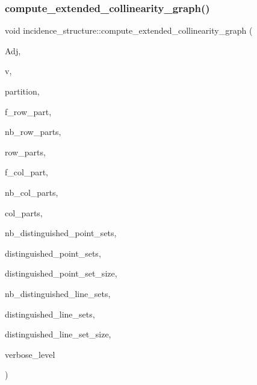 \subsubsection{\texorpdfstring{compute\+\_\+extended\+\_\+collinearity\+\_\+graph()}{compute\_extended\_collinearity\_graph()}}
{\footnotesize\ttfamily void incidence\+\_\+structure\+::compute\+\_\+extended\+\_\+collinearity\+\_\+graph (\begin{DoxyParamCaption}\item[{\mbox{\hyperlink{galois_8h_a09fddde158a3a20bd2dcadb609de11dc}{I\+NT}} $\ast$\&}]{Adj,  }\item[{\mbox{\hyperlink{galois_8h_a09fddde158a3a20bd2dcadb609de11dc}{I\+NT}} \&}]{v,  }\item[{\mbox{\hyperlink{galois_8h_a09fddde158a3a20bd2dcadb609de11dc}{I\+NT}} $\ast$\&}]{partition,  }\item[{\mbox{\hyperlink{galois_8h_a09fddde158a3a20bd2dcadb609de11dc}{I\+NT}}}]{f\+\_\+row\+\_\+part,  }\item[{\mbox{\hyperlink{galois_8h_a09fddde158a3a20bd2dcadb609de11dc}{I\+NT}}}]{nb\+\_\+row\+\_\+parts,  }\item[{\mbox{\hyperlink{galois_8h_a09fddde158a3a20bd2dcadb609de11dc}{I\+NT}} $\ast$}]{row\+\_\+parts,  }\item[{\mbox{\hyperlink{galois_8h_a09fddde158a3a20bd2dcadb609de11dc}{I\+NT}}}]{f\+\_\+col\+\_\+part,  }\item[{\mbox{\hyperlink{galois_8h_a09fddde158a3a20bd2dcadb609de11dc}{I\+NT}}}]{nb\+\_\+col\+\_\+parts,  }\item[{\mbox{\hyperlink{galois_8h_a09fddde158a3a20bd2dcadb609de11dc}{I\+NT}} $\ast$}]{col\+\_\+parts,  }\item[{\mbox{\hyperlink{galois_8h_a09fddde158a3a20bd2dcadb609de11dc}{I\+NT}}}]{nb\+\_\+distinguished\+\_\+point\+\_\+sets,  }\item[{\mbox{\hyperlink{galois_8h_a09fddde158a3a20bd2dcadb609de11dc}{I\+NT}} $\ast$$\ast$}]{distinguished\+\_\+point\+\_\+sets,  }\item[{\mbox{\hyperlink{galois_8h_a09fddde158a3a20bd2dcadb609de11dc}{I\+NT}} $\ast$}]{distinguished\+\_\+point\+\_\+set\+\_\+size,  }\item[{\mbox{\hyperlink{galois_8h_a09fddde158a3a20bd2dcadb609de11dc}{I\+NT}}}]{nb\+\_\+distinguished\+\_\+line\+\_\+sets,  }\item[{\mbox{\hyperlink{galois_8h_a09fddde158a3a20bd2dcadb609de11dc}{I\+NT}} $\ast$$\ast$}]{distinguished\+\_\+line\+\_\+sets,  }\item[{\mbox{\hyperlink{galois_8h_a09fddde158a3a20bd2dcadb609de11dc}{I\+NT}} $\ast$}]{distinguished\+\_\+line\+\_\+set\+\_\+size,  }\item[{\mbox{\hyperlink{galois_8h_a09fddde158a3a20bd2dcadb609de11dc}{I\+NT}}}]{verbose\+\_\+level }\end{DoxyParamCaption})}

